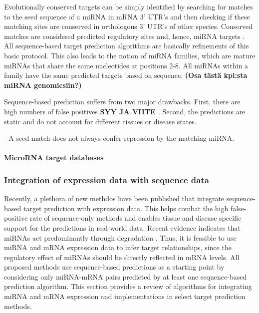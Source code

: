 Evolutionally conserved targets can be simply identified by searching for
matches to the seed sequence of a miRNA in mRNA 3' UTR's and then checking if
these matching sites are conserved in orthologous 3' UTR's of other species.
Conserved matches are considered predicted regulatory sites and, hence, miRNA
targets \citep{Bartel2009}. All sequence-based target prediction algorithms are basically
refinements of this basic protocol. This also leads to the notion of miRNA
families, which are mature miRNAs that share the same nucleotides at positions
2-8. All miRNAs within a family have the same predicted targets based on sequence.
\textbf{(Osa tästä kpl:sta miRNA genomicsiin?)}

Sequence-based prediction suffers from two major drawbacks. First, there are
high numbers of false positives \textbf{SYY JA VIITE
\citep{Sethupathy2006?}}. Second, the predictions are static and do not
account for different tissues or disease states.

- A seed match does not always confer repression by the matching miRNA.\citep{Grimson2007} %


\paragraph{MicroRNA target databases}





\subsubsection{Integration of expression data with sequence data}\label
{integration-of-expression-data-with-sequence-data}

Recently, a plethora of new methdos have been published that integrate
sequence-based target prediction with expression data. This helps combat the
high false-positive rate of sequence-only methods and enables tissue and
disease specific support for the predictions in real-world data. Recent
evidence indicates that miRNAs act predominantly through degradation
\citep{CITE}. Thus, it is feasible to use miRNA and mRNA expression data to
infer target relationships, since the regulatory effect of miRNAs should be
directly reflected in mRNA levels. All proposed methods use sequence-based
predictions as a starting point by considering only miRNA-mRNA pairs predicted
by at least one sequence-based prediction algorithm. This section provides a
review of algorithms for integrating miRNA and mRNA expression and
implementations in select target prediction methods.

